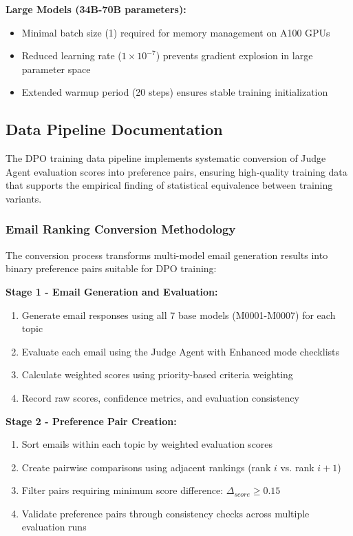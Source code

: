 \textbf{Large Models (34B-70B parameters):}
\begin{itemize}
    \item Minimal batch size (1) required for memory management on A100 GPUs
    \item Reduced learning rate ($1 \times 10^{-7}$) prevents gradient explosion in large parameter space
    \item Extended warmup period (20 steps) ensures stable training initialization
\end{itemize}

\subsection{Data Pipeline Documentation}
\label{subsec:dpo-data-pipeline}

The DPO training data pipeline implements systematic conversion of Judge Agent evaluation scores into preference pairs, ensuring high-quality training data that supports the empirical finding of statistical equivalence between training variants.

\subsubsection{Email Ranking Conversion Methodology}

The conversion process transforms multi-model email generation results into binary preference pairs suitable for DPO training:

\textbf{Stage 1 - Email Generation and Evaluation:}
\begin{enumerate}
    \item Generate email responses using all 7 base models (M0001-M0007) for each topic
    \item Evaluate each email using the Judge Agent with Enhanced mode checklists
    \item Calculate weighted scores using priority-based criteria weighting
    \item Record raw scores, confidence metrics, and evaluation consistency
\end{enumerate}

\textbf{Stage 2 - Preference Pair Creation:}
\begin{enumerate}
    \item Sort emails within each topic by weighted evaluation scores
    \item Create pairwise comparisons using adjacent rankings (rank $i$ vs. rank $i+1$)
    \item Filter pairs requiring minimum score difference: $\Delta_{score} \geq 0.15$
    \item Validate preference pairs through consistency checks across multiple evaluation runs
\end{enumerate}

